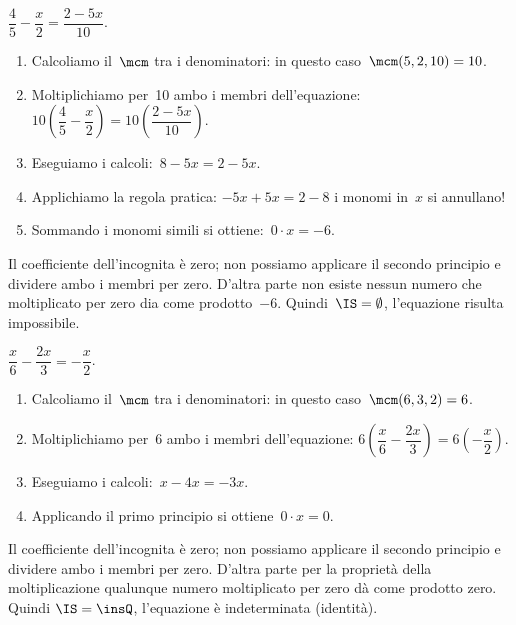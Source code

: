  \begin{esempio}
 \(\dfrac{4}{5}-\dfrac{x}{2}=\dfrac{2-5x}{10}\).

 \begin{enumerate} [nosep]
  \item Calcoliamo il~\(\mcm\) tra i denominatori: in questo
caso~\(\mcm(5, 2, 10) = 10\).
  \item Moltiplichiamo per~10 ambo i membri
dell'equazione:
\(10\left(\dfrac{4}{5}-\dfrac{x}{2}\right)=10\left(\dfrac{2-5x}{10}\right)\).
  \item Eseguiamo i calcoli:~\(8-5x=2-5x\).
  \item Applichiamo la regola pratica:
\(-5x+5x=2-8\) i monomi in~\(x\) si annullano!
  \item Sommando i monomi simili si ottiene:~\(0\cdot x=-6\).
 \end{enumerate}

Il coefficiente dell'incognita è zero; non possiamo
applicare il secondo principio e dividere ambo i membri per zero.
D'altra parte non esiste nessun numero che moltiplicato
per zero dia come prodotto~\(-6\). Quindi~\(\IS =\emptyset \),
l'equazione risulta impossibile.
 \end{esempio}

 \begin{esempio}
\(\dfrac{x}{6}-\dfrac{2x}{3}=-{\dfrac{x}{2}}\).

\begin{enumerate} [nosep]
 \item Calcoliamo il~\(\mcm\) tra i denominatori: in questo
caso~\(\mcm(6, 3, 2) = 6\).
 \item Moltiplichiamo per~6 ambo i membri
dell'equazione:
\(6\left(\dfrac{x}{6}-\dfrac{2x}{3}\right)=6\left(-{\dfrac{x}{2}}\right)\).
 \item Eseguiamo i calcoli:~\(x-4x=-3x\).
 \item Applicando il primo principio si ottiene~\(0\cdot x=0\).
\end{enumerate}

Il coefficiente dell'incognita è zero; non possiamo
applicare il secondo principio e dividere ambo i membri per zero.
D'altra parte per la proprietà della moltiplicazione
qualunque numero moltiplicato per zero dà come prodotto zero. Quindi
\(\IS = \insQ\), l'equazione è indeterminata (identità).
 \end{esempio}

